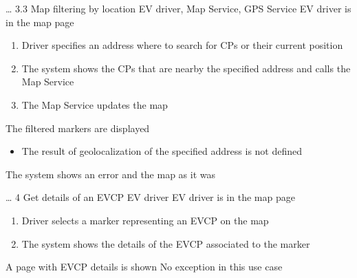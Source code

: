 \usecase
{
    \dots %
}
{3.3}
{Map filtering by location}
{EV driver, Map Service, GPS Service}
{EV driver is in the map page}
{
    \begin{enumerate}
        \item Driver specifies an address where to search for CPs or their current position
        \item The system shows the CPs that are nearby the specified address and calls the Map Service
        \item The Map Service updates the map
    \end{enumerate}
}
{The filtered markers are displayed}
{
    \begin{itemize}
        \item The result of geolocalization of the specified address is not defined
    \end{itemize}
}
{
    The system shows an error and the map as it was
}

\usecase
{
    \dots %
}
{4}
{Get details of an EVCP}
{EV driver}
{EV driver is in the map page}
{
    \begin{enumerate}
        \item Driver selects a marker representing an EVCP on the map
        \item The system shows the details of the EVCP associated to the marker
    \end{enumerate}
}
{A page with EVCP details is shown}
{
    No exception in this use case
}
{
}

